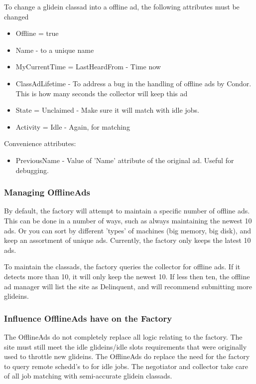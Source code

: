\documentclass[11pt]{article}
\begin{document}
To change a glidein classad into a offline ad, the following attributes must be changed

\begin{itemize}
\item Offline = true
\item Name - to a unique name
\item MyCurrentTime = LastHeardFrom - Time now
\item ClassAdLifetime - To address a bug in the handling of offline ads by Condor. This is how many seconds the collector will keep this ad
\item State = Unclaimed - Make sure it will match with idle jobs.
\item Activity = Idle - Again, for matching 
\end{itemize}

Convenience attributes: 
\begin{itemize}
\item PreviousName - Value of 'Name' attribute of the original ad. Useful for debugging. 
\end{itemize}

\subsubsection{Managing OfflineAds}
By default, the factory will attempt to maintain a specific number of offline ads. This can be done in a number of ways, such as always maintaining the newest 10 ads. Or you can sort by different 'types' of machines (big memory, big disk), and keep an assortment of unique ads.  Currently, the factory only keeps the latest 10 ads.

To maintain the classads, the factory queries the collector for offline ads. If it detects more than 10, it will only keep the newest 10. If less then ten, the offline ad manager will list the site as Delinquent, and will recommend submitting more glideins.

\subsubsection{Influence OfflineAds have on the Factory}
The OfflineAds do not completely replace all logic relating to the factory. The site must still meet the idle glideins/idle slots requirements that were originally used to throttle new glideins. The OfflineAds do replace the need for the factory to query remote schedd's to for idle jobs. The negotiator and collector take care of all job matching with semi-accurate glidein classads.
\end{document}
